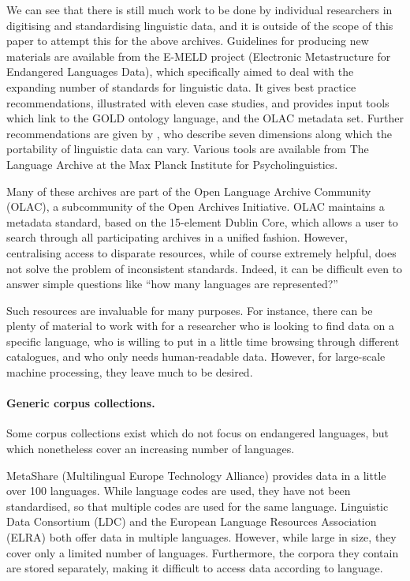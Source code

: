 We can see that there is still much work to be done by individual researchers in digitising and standardising linguistic data, and it is outside of the scope of this paper to attempt this for the above archives.  Guidelines for producing new materials are available from the E-MELD project (Electronic Metastructure for Endangered Languages Data), which specifically aimed to deal with the expanding number of standards for linguistic data.  It gives best practice recommendations, illustrated with eleven case studies, and provides input tools which link to the GOLD ontology language, and the OLAC metadata set.  Further recommendations are given by , who describe seven dimensions along which the portability of linguistic data can vary. Various tools are available from The Language Archive at the Max Planck Institute for Psycholinguistics.

Many of these archives are part of the Open Language Archive Community (OLAC), a subcommunity of the Open Archives Initiative.  OLAC maintains a metadata standard, based on the 15-element Dublin Core, which allows a user to search through all participating archives in a unified fashion.  However, centralising access to disparate resources, while of course extremely helpful, does not solve the problem of inconsistent standards.  Indeed, it can be difficult even to answer simple questions like ``how many languages are represented?''

Such resources are invaluable for many purposes. For instance, there can be plenty of material to work with for a
researcher who is looking to find data on a specific language, who is willing to put in a little time browsing through different catalogues, and who only needs human-readable data.  However, for large-scale machine processing, they leave much to be desired.


\paragraph{Generic corpus collections.}
Some corpus collections exist which do not focus on endangered languages, but which nonetheless cover an increasing number of languages.

MetaShare (Multilingual Europe Technology Alliance) provides data in a little over 100 languages. While language codes are used, they have not been standardised, so that multiple codes are used for the same language.  Linguistic Data Consortium (LDC) and the European Language Resources Association (ELRA) both offer data in multiple languages.  However, while large in size, they cover only a limited number of languages.  Furthermore, the corpora they contain are stored separately, making it difficult to access data according to language.

